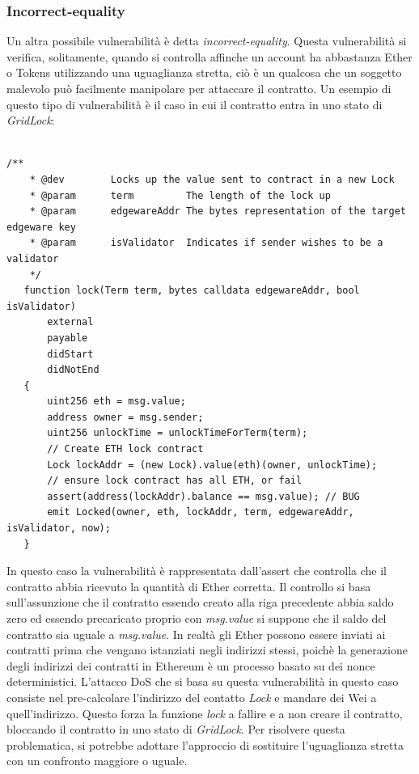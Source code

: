 \documentclass[../../Thesis.tex]{subfiles}
\begin{document}
\subsubsection*{Incorrect-equality}
Un altra possibile vulnerabilit\`a \`e detta \emph{incorrect-equality}. Questa vulnerabilit\`a si verifica, solitamente, quando si controlla affinche un account ha abbastanza Ether o Tokens utilizzando una uguaglianza stretta, ci\`o \`e un qualcosa che un soggetto malevolo pu\`o facilmente manipolare per attaccare il contratto. Un esempio di questo tipo di vulnerabilit\`a \`e il caso in cui il contratto entra in uno stato di \emph{GridLock}:\\
\\
\begin{lstlisting}[language=Solidity]
    /**
    * @dev        Locks up the value sent to contract in a new Lock
    * @param      term         The length of the lock up
    * @param      edgewareAddr The bytes representation of the target edgeware key
    * @param      isValidator  Indicates if sender wishes to be a validator
    */
   function lock(Term term, bytes calldata edgewareAddr, bool isValidator)
       external
       payable
       didStart
       didNotEnd
   {
       uint256 eth = msg.value;
       address owner = msg.sender;
       uint256 unlockTime = unlockTimeForTerm(term);
       // Create ETH lock contract
       Lock lockAddr = (new Lock).value(eth)(owner, unlockTime);
       // ensure lock contract has all ETH, or fail
       assert(address(lockAddr).balance == msg.value); // BUG
       emit Locked(owner, eth, lockAddr, term, edgewareAddr, isValidator, now);
   }
\end{lstlisting}
In questo caso la vulnerabilit\`a \`e rappresentata dall'assert che controlla che il contratto abbia ricevuto la quantit\`a di Ether corretta. Il controllo si basa sull'assunzione che il contratto essendo creato alla riga precedente abbia saldo zero ed essendo precaricato proprio con \emph{msg.value} si suppone che il saldo del contratto sia uguale a \emph{msg.value}. In realt\`a gli Ether possono essere inviati ai contratti prima che vengano istanziati negli indirizzi stessi, poich\`e la generazione degli indirizzi dei contratti in Ethereum \`e un processo basato su dei nonce deterministici. L'attacco DoS che si basa su questa vulnerabilit\`a in questo caso consiste nel pre-calcolare l'indirizzo del contatto \emph{Lock} e mandare dei Wei a quell'indirizzo. Questo forza la funzione \emph{lock} a fallire e a non creare il contratto, bloccando il contratto in uno stato di \emph{GridLock}.  Per risolvere questa problematica, si potrebbe adottare l'approccio di sostituire l'uguaglianza stretta con un confronto maggiore o uguale. 
\end{document}
